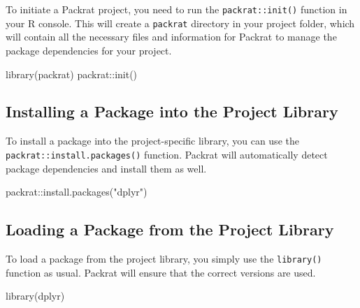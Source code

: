 \documentclass[
]{book}
\newenvironment{Shaded}{\begin{snugshade}}{\end{snugshade}}
\newcommand{\FunctionTok}[1]{\textcolor[rgb]{0.00,0.00,0.00}{#1}}
\newcommand{\NormalTok}[1]{#1}
\newcommand{\SpecialCharTok}[1]{\textcolor[rgb]{0.00,0.00,0.00}{#1}}
\newcommand{\StringTok}[1]{\textcolor[rgb]{0.31,0.60,0.02}{#1}}
\begin{document}
To initiate a Packrat project, you need to run the \texttt{packrat::init()} function in your R console. This will create a \texttt{packrat} directory in your project folder, which will contain all the necessary files and information for Packrat to manage the package dependencies for your project.

\begin{Shaded}
\begin{Highlighting}[]
\FunctionTok{library}\NormalTok{(packrat)}
\NormalTok{packrat}\SpecialCharTok{::}\FunctionTok{init}\NormalTok{()}
\end{Highlighting}
\end{Shaded}

\hypertarget{installing-a-package-into-the-project-library}{%
\subsection*{Installing a Package into the Project Library}\label{installing-a-package-into-the-project-library}}

To install a package into the project-specific library, you can use the \texttt{packrat::install.packages()} function. Packrat will automatically detect package dependencies and install them as well.

\begin{Shaded}
\begin{Highlighting}[]
\NormalTok{packrat}\SpecialCharTok{::}\FunctionTok{install.packages}\NormalTok{(}\StringTok{"dplyr"}\NormalTok{)}
\end{Highlighting}
\end{Shaded}

\hypertarget{loading-a-package-from-the-project-library}{%
\subsection*{Loading a Package from the Project Library}\label{loading-a-package-from-the-project-library}}

To load a package from the project library, you simply use the \texttt{library()} function as usual. Packrat will ensure that the correct versions are used.

\begin{Shaded}
\begin{Highlighting}[]
\FunctionTok{library}\NormalTok{(dplyr)}
\end{Highlighting}
\end{Shaded}
\end{document}
